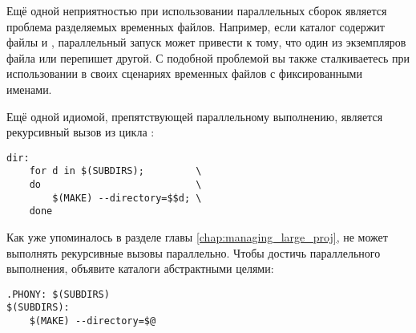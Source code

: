 Ещё одной неприятностью при использовании параллельных сборок является
проблема разделяемых временных файлов. Например, если каталог содержит
файлы  и , параллельный запуск
 может привести к тому, что один из экземпляров файла
 или  перепишет другой. С подобной
проблемой вы также сталкиваетесь при использовании в своих сценариях
временных файлов с фиксированными именами.

Ещё одной идиомой, препятствующей параллельному выполнению, является
рекурсивный вызов \GNUmake{} из цикла :

{\footnotesize
\begin{verbatim}
dir:
    for d in $(SUBDIRS);         \
    do                           \
        $(MAKE) --directory=$$d; \
    done
\end{verbatim}
}

Как уже упоминалось в разделе  главы
\ref{chap:managing_large_proj}, \GNUmake{} не может выполнять
рекурсивные вызовы параллельно. Чтобы достичь параллельного
выполнения, объявите каталоги абстрактными целями:

{\footnotesize
\begin{verbatim}
.PHONY: $(SUBDIRS)
$(SUBDIRS):
    $(MAKE) --directory=$@
\end{verbatim}
}
